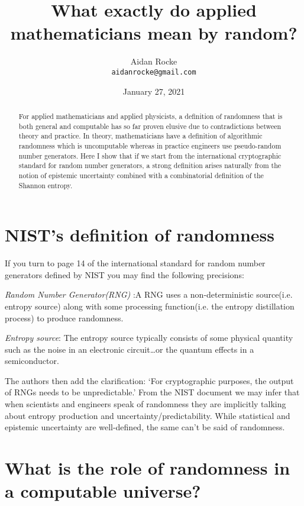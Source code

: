\documentclass{article}
\title{What exactly do applied mathematicians mean by random?}
\date{January 27, 2021}
\author{%
  Aidan Rocke\\
  \texttt{aidanrocke@gmail.com} \\
}
\begin{document}

\maketitle

\begin{abstract}
   For applied mathematicians and applied physicists, a definition of 
randomness that is both general and computable has so far proven  
elusive due to contradictions between theory and practice. In theory, 
mathematicians have a definition of algorithmic randomness which is 
uncomputable whereas in practice engineers use pseudo-random number generators.
Here I show that if we start from the international cryptographic standard
for random number generators, a strong definition arises naturally from the notion of epistemic uncertainty combined with a combinatorial definition of
the Shannon entropy. \end{abstract}

\section{NIST's definition of randomness}

If you turn to page 14 of the international standard for random number generators defined by NIST you may find the following precisions:

\textit{Random Number Generator(RNG)} :A RNG uses a non-deterministic source(i.e. entropy source) along with some processing function(i.e. the entropy distillation process) to produce randomness.

\textit{Entropy source}: The entropy source typically consists of some physical quantity such as the noise in an electronic circuit…or the quantum effects in a semiconductor.

The authors then add the clarification: ‘For cryptographic purposes, the output of RNGs needs to be unpredictable.’ From the NIST document we may infer that when scientists and engineers speak of randomness they are implicitly talking about entropy production and uncertainty/predictability. While statistical and epistemic uncertainty are well-defined, the same can't be said of randomness. 

\section{What is the role of randomness in a computable universe?}
\end{document}
